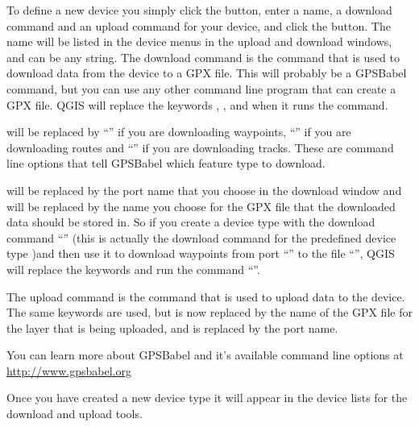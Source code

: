 To define a new device you simply click the  button, enter a name, a download command and an upload command for your device, and click the  button.
The name will be listed in the device menus in the upload and download windows, and can be any string.
The download command is the command that is used to download data from the device to a GPX file.
This will probably be a GPSBabel command, but you can use any other command line program that can create a GPX file.
QGIS will replace the keywords , , and  when it runs the command.

 will be replaced by {}``'' if you are downloading waypoints, {}``'' if you are downloading routes and {}``'' if you are downloading tracks.
These are command line options that tell GPSBabel which feature type to download.

 will be replaced by the port name that you choose in the download window and  will be replaced by the name you choose for the GPX file that the downloaded data should be stored in.
So if you create a device type with the download command {}``'' (this is actually the download command for the predefined device type )and then use it to download waypoints from port {}``'' to the file {}``'', QGIS will replace the keywords and run the command {}``''.

The upload command is the command that is used to upload data to the device.
The same keywords are used, but  is now replaced by the name of the GPX file for the layer that is being uploaded, and  is replaced by the port name.

You can learn more about GPSBabel and it's available command line options at \url{http://www.gpsbabel.org}

Once you have created a new device type it will appear in the device lists for the download and upload tools.
